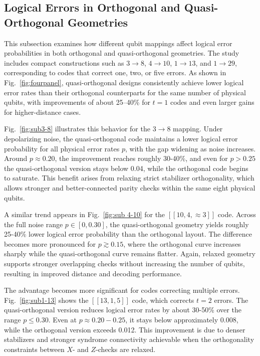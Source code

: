 \documentclass{iopjournal}
\theoremstyle{thmstyleone}%
\theoremstyle{thmstyletwo}%
\theoremstyle{thmstylethree}%
\begin{document}


    \subsection{Logical Errors in Orthogonal and Quasi-Orthogonal Geometries}

This subsection examines how different qubit mappings affect logical error probabilities in both 
orthogonal and quasi-orthogonal geometries. The study includes compact constructions such as 
\(3 \to 8\), \(4 \to 10\), \(1 \to 13\), and \(1 \to 29\), corresponding to codes that correct one, two, or 
five errors. As shown in Fig.~\ref{fig:fourpanel}, quasi-orthogonal designs consistently achieve lower 
logical error rates than their orthogonal counterparts for the same number of physical qubits, with improvements of about 25--40\% for \(t=1\) codes and even larger gains for higher-distance cases.

Fig.~\ref{fig:sub3-8} illustrates this behavior for the \(3 \to 8\) mapping. Under depolarizing noise, the quasi-orthogonal code maintains a lower logical error probability for all physical error rates \(p\), with the gap widening as noise increases. Around \(p \approx 0.20\), the improvement reaches roughly 30-40\%, and even for \(p > 0.25\) the quasi-orthogonal version stays below 0.04, while the orthogonal code begins to saturate. This benefit arises from relaxing strict stabilizer orthogonality, which allows 
stronger and better-connected parity checks within the same eight physical qubits.

A similar trend appears in Fig.~\ref{fig:sub 4-10} for the \([[10,4,\approx 3]]\) code. Across the full noise range \(p \in [0,0.30]\), the quasi-orthogonal geometry yields roughly 25-40\% lower logical error probability than the orthogonal layout. The difference becomes more pronounced for \(p \gtrsim 0.15\), 
where the orthogonal curve increases sharply while the quasi-orthogonal curve remains flatter. Again, relaxed geometry supports stronger overlapping checks without increasing the number of qubits, resulting in improved distance and decoding performance.

The advantage becomes more significant for codes correcting multiple errors. Fig.~\ref{fig:sub1-13} shows the \([[13,1,5]]\) code, which corrects \(t=2\) errors. The quasi-orthogonal 
version reduces logical error rates by about 30-50\% over the range \(p \le 0.30\). Even at \(p \approx 0.20{-}0.25\), it stays below approximately 0.008, while the orthogonal version exceeds 0.012. This improvement is due to denser stabilizers and stronger syndrome connectivity achievable when the orthogonality constraints between \(X\)- and \(Z\)-checks are relaxed.
\end{document}

